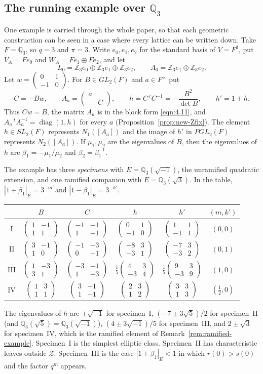 \documentclass[12pt,letterpaper]{amsart}
\numberwithin{equation}{section}
\theoremstyle{definition}
\theoremstyle{plain}
\newcommand{\smat}[4]{\left(\begin{smallmatrix}#1&#2\\#3&#4\end{smallmatrix}\right)}
\begin{document}
\subsection{The running example over $\mathbb Q_3$}
\label{sec:intro-running}

One example is carried through the whole paper, so that each geometric
construction can be seen in a case where every lattice can be written
down. Take $F=\mathbb Q_3$, so $q=3$ and $\pi=3$. Write
$e_0,e_1,e_2$ for the standard basis of $V=F^3$, put
$V_A=Fe_0$ and $W_A=Fe_1\oplus Fe_2$, and let
\[
 L_0=\mathbb Z_3e_0\oplus\mathbb Z_3e_1\oplus\mathbb Z_3e_2,
 \qquad
 \Lambda_0=\mathbb Z_3e_1\oplus\mathbb Z_3e_2 .
\]
Let $w=\smat{0}{1}{-1}{0}$. For $B\in GL_2(F)$ and $a\in F^\times$ put
\begin{equation}\label{eq:run-Aa}
 C=-Bw,\qquad
 A_a=\begin{pmatrix}a&\\&C\end{pmatrix},
 \qquad
 h=C\,{}^tC^{-1}=-\frac{B^2}{\det B},
 \qquad h'=1+h .
\end{equation}
Thus $Cw=B$, the matrix $A_a$ is in the block form \eqref{eqn:4.11},
and $A_a\,{}^tA_a^{-1}=\operatorname{diag}(1,h)$ for every $a$
(Proposition~\ref{prop:new-Zfix}). The element $h\in SL_2(F)$
represents $N_1([A_a])$ and the image of $h'$ in $PGL_2(F)$ represents
$N_2([A_a])$. If $\mu_1,\mu_2$ are the eigenvalues of $B$, then the
eigenvalues of $h$ are $\beta_1=-\mu_1/\mu_2$ and $\beta_2=\beta_1^{-1}$.

The example has three \emph{specimens} with $E=\mathbb Q_3(\sqrt{-1})$,
the unramified quadratic extension, and one ramified companion with
$E=\mathbb Q_3(\sqrt3)$. In the table, $|1+\beta_1|_E=3^{-m}$ and
$|1-\beta_1|_E=3^{-k'}$.
\begin{center}
\small
\renewcommand{\arraystretch}{1.35}
\begin{tabular}{@{}cccccc@{}}
\toprule
 & $B$ & $C$ & $h$ & $h'$ & $(m,k')$\\
\midrule
I & $\smat{1}{-1}{1}{1}$ & $\smat{-1}{-1}{1}{-1}$ & $\smat{0}{1}{-1}{0}$
  & $\smat{1}{1}{-1}{1}$ & $(0,0)$\\
II & $\smat{3}{-1}{1}{0}$ & $\smat{-1}{-3}{0}{-1}$ & $\smat{-8}{3}{-3}{1}$
  & $\smat{-7}{3}{-3}{2}$ & $(0,1)$\\
III & $\smat{1}{-3}{3}{1}$ & $\smat{-3}{-1}{1}{-3}$
  & $\tfrac15\smat{4}{3}{-3}{4}$ & $\tfrac15\smat{9}{3}{-3}{9}$ & $(1,0)$\\
IV & $\smat{1}{3}{1}{1}$ & $\smat{3}{-1}{1}{-1}$ & $\smat{2}{3}{1}{2}$
  & $\smat{3}{3}{1}{3}$ & $(\tfrac12,0)$\\
\bottomrule
\end{tabular}
\end{center}
The eigenvalues of $h$ are $\pm\sqrt{-1}$ for specimen~I,
$(-7\pm3\sqrt5)/2$ for specimen~II (and
$\mathbb Q_3(\sqrt5)=\mathbb Q_3(\sqrt{-1})$),
$(4\pm3\sqrt{-1})/5$ for specimen~III, and $2\pm\sqrt3$ for
specimen~IV, which is the ramified element of Remark~\ref{rem:ramified-example}.
Specimen~I is the simplest elliptic class. Specimen~II has
characteristic leaves outside $\mathcal Z$. Specimen~III is the case
$|1+\beta_1|_E<1$ in which $r(0)>s(0)$ and the factor $q^m$ appears.
\end{document}
